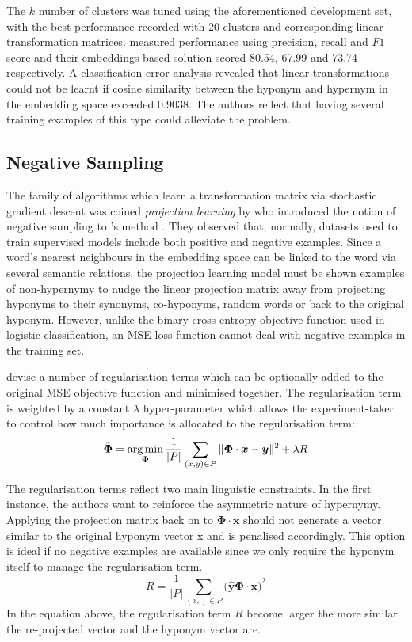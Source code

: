 The $k$ number of clusters was tuned using the aforementioned development set, with the best performance recorded with 20 clusters and corresponding linear transformation matrices.  \citeauthor{Fu2014} measured performance using precision, recall and $F1$ score and their embeddings-based solution scored 80.54, 67.99 and 73.74 respectively.  A classification error analysis revealed that linear transformations could not be learnt if cosine similarity between the hyponym and hypernym in the embedding space exceeded 0.9038.  The authors reflect that having several training examples of this type could alleviate the problem.

\subsection{Negative Sampling} \label{Ustalov}
The family of algorithms which learn a transformation matrix via stochastic gradient descent was coined \textit{projection learning} by 
\citeauthor{ustalov2017negative} who introduced the notion of negative sampling to \citeauthor{Fu2014}'s method \citep{ustalov2017negative}.  They observed that, normally, datasets used to train supervised models include both positive and negative examples.  Since a word’s nearest neighbours in the embedding space can be linked to the word via several semantic relations, the projection learning model must be shown examples of non-hypernymy to nudge the linear projection matrix away from projecting hyponyms to their synonyms, co-hyponyms, random words or back to the original hyponym.  However, unlike the binary cross-entropy objective function used in logistic classification, an \ac{MSE} loss function cannot deal with negative examples in the training set.

\citeauthor{ustalov2017negative} devise a number of regularisation terms which can be optionally added to the original \ac{MSE} objective function and minimised together.  The regularisation term is weighted by a constant $\lambda$ hyper-parameter which allows the experiment-taker to control how much importance is allocated to the regularisation term:
\[\hat{\bm{\Phi}} = \operatorname*{arg\,min}_{\bm{\Phi}} \frac{1}{\vert P \vert} \sum_{(x,y) \in P} \Vert \bm{\Phi}\cdot\bm{x} - \bm {y} \Vert^2 + \lambda R\]

The regularisation terms reflect two main linguistic constraints.  In the first instance, the authors want to reinforce the asymmetric nature of hypernymy.  Applying the projection matrix back on to $\bm{\Phi} \cdot \bm{x}$ should not generate a vector similar to the original hyponym vector x and is penalised accordingly.  This option is ideal if no negative examples are available since we only require the hyponym itself to manage the regularisation term.
\[R = \frac{1}{\vert P \vert} \sum_{(x,) \in P} \big( \hat{\bm{y}} \bm{\Phi} \cdot \bm{x} \big)^2  \]
In the equation above, the regularisation term $R$ become larger the more similar the re-projected vector and the hyponym vector are. 

